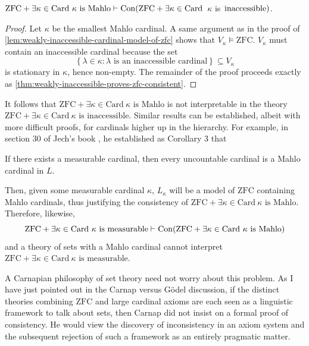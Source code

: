 \documentclass[12pt]{article}
\theoremstyle{plain}
\theoremstyle{definition}
\newcommand{\ZFC}{\mathrm{ZFC}}
\newcommand{\Card}{\mathrm{Card}}
\DeclareMathOperator{\Con}{Con}
\begin{document}
\begin{proposition}
	$\ZFC + \exists \kappa \in \Card \ \text{$\kappa$ is Mahlo} \vdash \Con\mleft(\ZFC + \exists \kappa \in \Card\mright.$ $\kappa$ is $\mleft.\text{inaccessible}\mright)$.
\end{proposition}

\begin{proof}
	Let $\kappa$ be the smallest Mahlo cardinal. A same argument as in the proof of \autoref{lem:weakly-inaccessible-cardinal-model-of-zfc} shows that $V_\kappa \vDash \ZFC$. $V_\kappa$ must contain an inaccessible cardinal because the set
	\[\left\{\lambda \in \kappa : \text{$\lambda$ is an inaccessible cardinal}\right\} \subseteq V_\kappa\]
	is stationary in $\kappa$, hence non-empty. The remainder of the proof proceeds exactly as \autoref{thm:weakly-inaccessible-proves-zfc-consistent}.
\end{proof}

It follows that $\ZFC + \exists \kappa \in \Card \ \text{$\kappa$ is Mahlo}$ is not interpretable in the theory $\ZFC + \exists \kappa \in \Card \ \text{$\kappa$ is inaccessible}$. Similar results can be established, albeit with more difficult proofs, for cardinals higher up in the hierarchy. For example, in section 30 of Jech's book \cite{jech-set-theory}, he established as Corollary 3 that

\begin{proposition}
	If there exists a measurable cardinal, then every uncountable cardinal is a Mahlo cardinal in $L$.
\end{proposition}

Then, given some measurable cardinal $\kappa$, $L_\kappa$ will be a model of $\ZFC$ containing Mahlo cardinals, thus justifying the consistency of $\ZFC + \exists \kappa \in \Card \ \text{$\kappa$ is Mahlo}$. Therefore, likewise,
\[\ZFC + \exists \kappa \in \Card \ \text{$\kappa$ is measurable} \vdash \Con\mleft(\ZFC + \exists \kappa \in \Card \ \text{$\kappa$ is Mahlo}\mright)\]
and a theory of sets with a Mahlo cardinal cannot interpret $\ZFC + \exists \kappa \in \Card \ \text{$\kappa$ is measurable}$.

A Carnapian philosophy of set theory need not worry about this problem. As I have just pointed out in the Carnap versus G\"odel discussion, if the distinct theories combining $\ZFC$ and large cardinal axioms are each seen as a linguistic framework to talk about sets, then Carnap did not insist on a formal proof of consistency. He would view the discovery of inconsistency in an axiom system and the subsequent rejection of such a framework as an entirely pragmatic matter.
\end{document}
